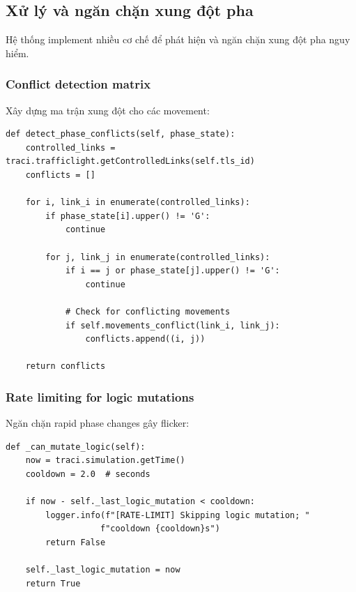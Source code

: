 \documentclass[12pt,a4paper,oneside]{report}
\begin{document}
\subsection{Xử lý và ngăn chặn xung đột pha}

Hệ thống implement nhiều cơ chế để phát hiện và ngăn chặn xung đột pha nguy hiểm.

\subsubsection{Conflict detection matrix}

Xây dựng ma trận xung đột cho các movement:

\begin{lstlisting}[style=py, caption={Phase conflict detection}]
def detect_phase_conflicts(self, phase_state):
    controlled_links = traci.trafficlight.getControlledLinks(self.tls_id)
    conflicts = []
    
    for i, link_i in enumerate(controlled_links):
        if phase_state[i].upper() != 'G':
            continue
            
        for j, link_j in enumerate(controlled_links):
            if i == j or phase_state[j].upper() != 'G':
                continue
                
            # Check for conflicting movements
            if self.movements_conflict(link_i, link_j):
                conflicts.append((i, j))
                
    return conflicts
\end{lstlisting}

\subsubsection{Rate limiting for logic mutations}

Ngăn chặn rapid phase changes gây flicker:

\begin{lstlisting}[style=py, caption={Logic mutation rate limiting}]
def _can_mutate_logic(self):
    now = traci.simulation.getTime()
    cooldown = 2.0  # seconds
    
    if now - self._last_logic_mutation < cooldown:
        logger.info(f"[RATE-LIMIT] Skipping logic mutation; "
                   f"cooldown {cooldown}s")
        return False
        
    self._last_logic_mutation = now
    return True
\end{lstlisting}
\end{document}
